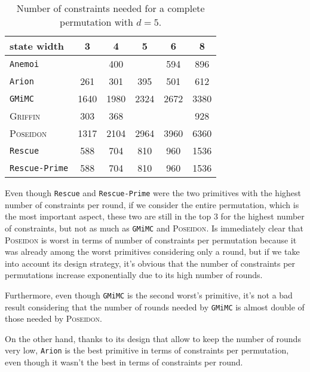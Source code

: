 \documentclass[12pt, a4paper]{report}
\begin{document}
\begin{table}[H]
  \caption{Number of constraints needed for a complete permutation with $d = 5$.}\label{tab:constraintsperm}
  \begin{center}
    \begin{tabular}{|l|c|c|c|c|c|}
      \hline
        state width & 3 & 4 & 5 & 6 & 8 \\
      \hline
        \texttt{Anemoi} & & 400 & & 594 & 896 \\
        \texttt{Arion} & \cellcolor{green!35} 261 & 301 & 395 & 501 & 612 \\
        \texttt{GMiMC} & \cellcolor{orange!35} 1640 & \cellcolor{orange!35} 1980 & \cellcolor{orange!35} 2324 & \cellcolor{orange!35} 2672 & \cellcolor{orange!35} 3380 \\
        \textsc{Griffin} & 303 & 368 & & & 928 \\
        \textsc{Poseidon} & \cellcolor{orange!35} 1317 & \cellcolor{orange!35} 2104 & \cellcolor{orange!35} 2964 & \cellcolor{orange!35} 3960 & \cellcolor{red!35} 6360 \\
        \texttt{Rescue} & 588 & 704 & 810 & 960 & \cellcolor{orange!35} 1536 \\
        \texttt{Rescue-Prime} & 588 & 704 & 810 & 960 & \cellcolor{orange!35} 1536 \\
      \hline
    \end{tabular}
  \end{center}
\end{table}

Even though \texttt{Rescue} and \texttt{Rescue-Prime} were the two primitives with the highest number of constraints per round, if we consider the entire permutation, which is the most important aspect, these two are still in the top 3 for the highest number of constraints, but not as much as \texttt{GMiMC} and \textsc{Poseidon}.
Is immediately clear that \textsc{Poseidon} is worst in terms of number of constraints per permutation because it was already among the worst primitives considering only a round, but if we take into account its design strategy, it's obvious that the number of constraints per permutations increase exponentially due to its high number of rounds.

Furthermore, even though \texttt{GMiMC} is the second worst's primitive, it's not a bad result considering that the number of rounds needed by \texttt{GMiMC} is almost double of those needed by \textsc{Poseidon}.

On the other hand, thanks to its design that allow to keep the number of rounds very low, \texttt{Arion} is the best primitive in terms of constraints per permutation, even though it wasn't the best in terms of constraints per round.
\end{document}
